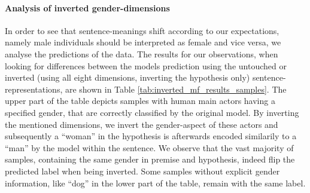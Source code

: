 \paragraph*{Analysis of inverted gender-dimensions}
In order to see that sentence-meanings shift according to our expectations, namely male individuals should be interpreted as female and vice versa, we analyse the predictions of the data. The results for our observations, when looking for differences between the models prediction using the untouched or inverted (using all eight dimensions, inverting the hypothesis only) sentence-representations, are shown in Table \ref{tab:inverted_mf_results_samples}. The upper part of the table depicts samples with human main actors having a specified gender, that are correctly classified by the original model. By inverting the mentioned dimensions, we invert the gender-aspect of these actors and subsequently a ``woman'' in the hypothesis is afterwards encoded similarily to a ``man'' by the model within the sentence. We observe that the vast majority of samples, containing the same gender in premise and hypothesis, indeed flip the predicted label when being inverted. Some samples without explicit gender information, like ``dog'' in the lower part of the table, remain with the same label. 
